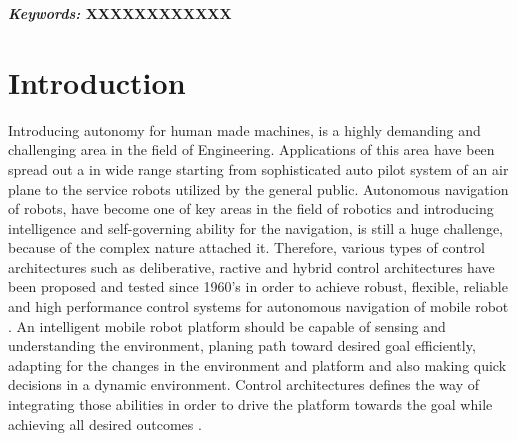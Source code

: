 \documentclass[a4paper,oneside,12pt]{report}
\begin{document}
\textbf{\textit{Keywords:} XXXXXXXXXXXX}



\setlength{\parindent}{5mm}
\normalsize
{}

\tableofcontents
{}
\clearpage


\clearpage



\setlength{\parindent}{5mm}
\normalsize
{}
\chapter{Introduction}
\label{ch:introduction}

Introducing autonomy for human made machines, is a highly demanding and challenging area in the field of Engineering. Applications of this area have been spread out a in wide range starting from sophisticated auto pilot system of an air plane to the service robots utilized by the general public. Autonomous navigation of robots, have become one of key areas in the field of robotics and introducing intelligence and self-governing ability for the navigation, is still a huge challenge, because of the complex nature attached it. Therefore, various types of control architectures such as deliberative, ractive and hybrid control architectures have been proposed and tested since 1960's in order to achieve robust, flexible, reliable and high performance control systems for autonomous navigation of mobile robot \cite{R01}. An intelligent mobile robot platform should be capable of sensing and understanding the environment, planing path toward desired goal efficiently, adapting for the changes in the environment and platform and also making quick decisions in a dynamic environment. Control architectures defines the way of integrating those abilities in order to drive the platform towards the goal while achieving all desired outcomes \cite{R01} \cite{R61}.
\end{document}

